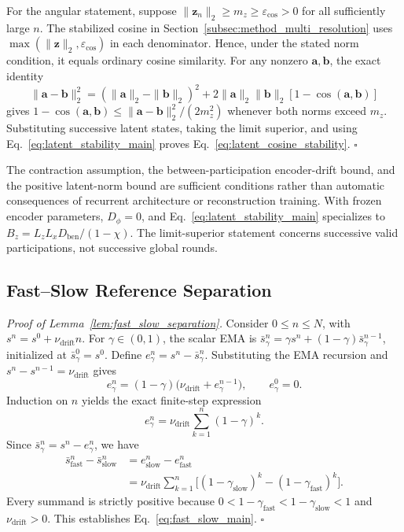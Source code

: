 For the angular statement, suppose $\|\mathbf{z}_n\|_2\geq m_z\geq\varepsilon_{\cos}>0$ for all sufficiently large $n$. The stabilized cosine in Section~\ref{subsec:method_multi_resolution} uses $\max(\|\mathbf{z}\|_2,\varepsilon_{\cos})$ in each denominator. Hence, under the stated norm condition, it equals ordinary cosine similarity. For any nonzero $\mathbf{a},\mathbf{b}$, the exact identity
\begin{equation}
\|\mathbf{a}-\mathbf{b}\|_2^2=(\|\mathbf{a}\|_2-\|\mathbf{b}\|_2)^2+2\|\mathbf{a}\|_2\|\mathbf{b}\|_2[1-\cos(\mathbf{a},\mathbf{b})]
\label{eq:app_cosine_identity}
\end{equation}
gives $1-\cos(\mathbf{a},\mathbf{b})\leq\|\mathbf{a}-\mathbf{b}\|_2^2/(2m_z^2)$ whenever both norms exceed $m_z$. Substituting successive latent states, taking the limit superior, and using Eq.~\eqref{eq:latent_stability_main} proves Eq.~\eqref{eq:latent_cosine_stability}. \hfill$\square$

\noindent The contraction assumption, the between-participation encoder-drift bound, and the positive latent-norm bound are sufficient conditions rather than automatic consequences of recurrent architecture or reconstruction training. With frozen encoder parameters, $D_\phi=0$, and Eq.~\eqref{eq:latent_stability_main} specializes to $B_z=L_zL_xD_{\mathrm{ben}}/(1-\chi)$. The limit-superior statement concerns successive valid participations, not successive global rounds.

\subsection{Fast--Slow Reference Separation}
\label{app:proof_fast_slow}

\noindent\textit{Proof of Lemma~\ref{lem:fast_slow_separation}.} Consider $0\leq n\leq N$, with $s^n=s^0+\nu_{\mathrm{drift}}n$. For $\gamma\in(0,1)$, the scalar EMA is $\bar s_{\gamma}^n=\gamma s^n+(1-\gamma)\bar s_{\gamma}^{n-1}$, initialized at $\bar s_{\gamma}^0=s^0$. Define $e_{\gamma}^n=s^n-\bar s_{\gamma}^n$. Substituting the EMA recursion and $s^n-s^{n-1}=\nu_{\mathrm{drift}}$ gives
\begin{equation}
e_{\gamma}^n=(1-\gamma)\big(\nu_{\mathrm{drift}}+e_{\gamma}^{n-1}\big),\qquad e_{\gamma}^0=0.
\label{eq:app_ema_lag_recursion}
\end{equation}
Induction on $n$ yields the exact finite-step expression
\begin{equation}
e_{\gamma}^n=\nu_{\mathrm{drift}}\sum_{k=1}^{n}(1-\gamma)^k.
\label{eq:app_ema_finite_lag}
\end{equation}
Since $\bar s_{\gamma}^n=s^n-e_{\gamma}^n$, we have
\begin{align}
\bar s_{\mathrm{fast}}^n-\bar s_{\mathrm{slow}}^n&=e_{\mathrm{slow}}^n-e_{\mathrm{fast}}^n\nonumber\\
&=\nu_{\mathrm{drift}}\sum_{k=1}^{n}\big[(1-\gamma_{\mathrm{slow}})^k-(1-\gamma_{\mathrm{fast}})^k\big].
\end{align}
Every summand is strictly positive because $0<1-\gamma_{\mathrm{fast}}<1-\gamma_{\mathrm{slow}}<1$ and $\nu_{\mathrm{drift}}>0$. This establishes Eq.~\eqref{eq:fast_slow_main}. \hfill$\square$

